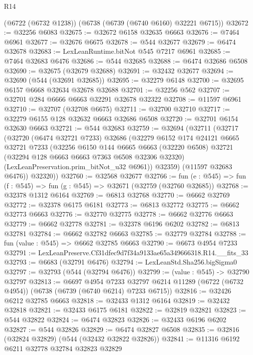 \begin{lexlean}{R14}
\begin{coremodule}
    (@6722 (@6732 @1238))
    (@6738 (@6739 (@6740 @6160) @32221 @6715))
@32672 := @32256 @6083
@32675 := @32672 @6158 @32635 @6663
@32676 := @7464 @6961
@32677 := @32676 @6675
@32678 := @544 @32677
@32679 := @6474 @32678
@32683 := LexLeanRuntime.bitNot @545 @7217 @6961
@32685 := @7464 @32683 @6476
@32686 := @544 @32685
@32688 := @6474 @32686 @6508
@32690 := @32675 (@32679 @32688)
@32691 := @32432 @32677
@32694 := @32690 (@544 (@32691 @32685))
@32695 := @32279 @6148
@32700 := @32695 @6157 @6668 @32634 @32678 @32688
@32701 := @32256 @562
@32707 := @32701 @284 @6666 @6663 @32291 @32678 @32322
@32708 := @11597 @6961
@32710 := @32707 (@32708 @6675)
@32711 := @32700 @32710
@32717 := @32279 @6155 @128 @32632 @6663 @32686 @6508
@32720 := @32701 @6154 @32630 @6663
@32721 := @544 @32683
@32759 := @32694
    (@32711
      (@32717
        (@32720
          (@6474 @32721 @7233)
          @32686
          (@32279
            @6152
            @174
            @24121
            @6665
            @32721
            @7233
            (@32256
              @6150
              @144
              @6665
              @6663
              (@32220 @6508)
              @32721
              (@32294 @128 @6663 @6663 @7363 @6508 @32306 @32320)
              (LexLeanPreservation.prim_bitNot_u32 @6961))
            @32359)
          (@11597 @32683 @6476))
        @32320))
@32760 := @32568 @32677
@32766 := fun (e : @545) => fun (f : @545) => fun (g : @545) => @32671 (@32759 (@32760 @32685))
@32768 := @32378 @1312 @6164
@32769 := @6813 @32768
@32770 := @6662 @32769
@32772 := @32378 @6175 @6181
@32773 := @6813 @32772
@32775 := @6662 @32773 @6663
@32776 := @32770 @32775
@32778 := @6662 @32776 @6663
@32779 := @6662 @32778
@32781 := @32378 @6196 @6202
@32782 := @6813 @32781
@32784 := @6662 @32782 @6663
@32785 := @32779 @32784
@32788 := fun (value : @545) => @6662 @32785 @6663
@32790 := @6673 @4954 @7233
@32791 := LexLeanPreserve.Cf31dfec9d7f34a9133ae65a349666318.R14.__fits_33
@32793 := @6683 (@32791 @6476)
@32794 := LexLeanStd.Sha256.bigSigma0
@32797 := @32793 (@544 (@32794 @6476))
@32799 := (value : @545) -> @32790 @32797
@32813 := @6697
    @4954
    @7233
    @32797
    @6214
    @11289
    (@6722 (@6732 @4954))
    (@6738 (@6739 (@6740 @6214) @7233 @6715))
@32816 := @32426 @6212 @32785 @6663
@32818 := @32433 @1312 @6164
@32819 := @32432 @32818
@32821 := @32433 @6175 @6181
@32822 := @32819 @32821
@32823 := @544 @32822
@32824 := @6474 @32823
@32826 := @32433 @6196 @6202
@32827 := @544 @32826
@32829 := @6474 @32827 @6508
@32835 := @32816 (@32824 @32829) (@544 (@32432 @32822 @32826))
@32841 := @11316 @6192 @6211 @32778 @32784 @32823 @32829

\end{coremodule}
\end{lexlean}
